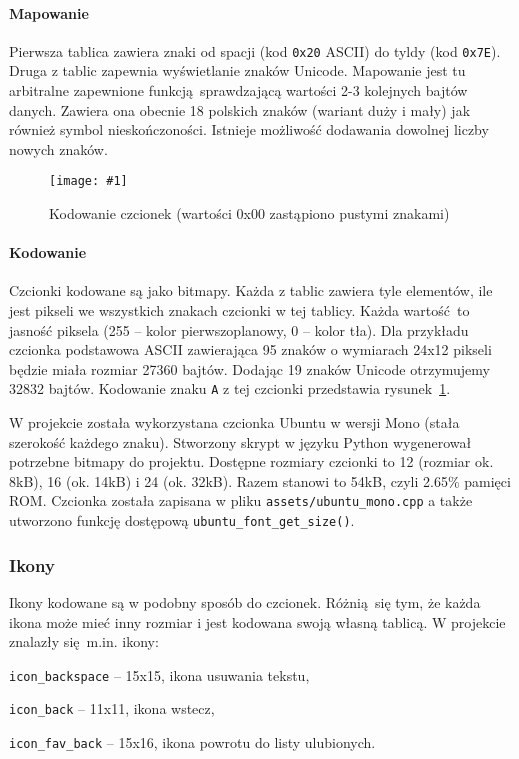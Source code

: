 \documentclass[polish]{aghengthesis}
\let\tempone\itemize
\let\temptwo\enditemize
\renewenvironment{itemize}{\tempone\setlength{\itemsep}{0cm}}{\temptwo}
\newcommand{\imgint}[4]{
	\begin{figure}[{#4}]
		\centering
		\texttt{[image: \#1]}
		\caption{#2}
		\label{#1}
	\end{figure}
}
\newcommand{\imgh}[3]{\imgint{#1}{#2}{#3}{H}}
\begin{document}
				\paragraph{Mapowanie}
					Pierwsza tablica zawiera znaki od spacji (kod \lstinline|0x20| ASCII) do tyldy (kod \lstinline|0x7E|). Druga z tablic zapewnia wyświetlanie znaków Unicode. Mapowanie jest tu arbitralne zapewnione funkcją sprawdzającą wartości 2-3 kolejnych bajtów danych. Zawiera ona obecnie 18 polskich znaków (wariant duży i mały) jak również symbol nieskończoności. Istnieje możliwość dodawania dowolnej liczby nowych znaków.
				
				\imgh{3/PicoRadio-screen-font}{Kodowanie czcionek (wartości 0x00 zastąpiono pustymi znakami)}{0.6}
				\paragraph{Kodowanie}
					Czcionki kodowane są jako bitmapy. Każda z tablic zawiera tyle elementów, ile jest pikseli we wszystkich znakach czcionki w tej tablicy. Każda wartość to jasność piksela (255 -- kolor pierwszoplanowy, 0 -- kolor tła). Dla przykładu czcionka podstawowa ASCII zawierająca 95 znaków o wymiarach 24x12 pikseli będzie miała rozmiar 27360 bajtów. Dodając 19 znaków Unicode otrzymujemy 32832 bajtów. Kodowanie znaku \lstinline|A| z tej czcionki przedstawia rysunek~\ref{3/PicoRadio-screen-font}.
				
				$ $\\
				W projekcie została wykorzystana czcionka Ubuntu\textsuperscript{\cite{ubuntu_font}} w wersji Mono (stała szerokość każdego znaku). Stworzony skrypt w języku Python wygenerował potrzebne bitmapy do projektu. Dostępne rozmiary czcionki to 12 (rozmiar ok. 8kB), 16 (ok. 14kB) i 24 (ok. 32kB). Razem stanowi to 54kB, czyli 2.65\% pamięci ROM. Czcionka została zapisana w pliku \lstinline|assets/ubuntu_mono.cpp| a także utworzono funkcję dostępową \lstinline|ubuntu_font_get_size()|. 
				
			\subsubsection{Ikony}
				Ikony kodowane są w podobny sposób do czcionek. Różnią się tym, że każda ikona może mieć inny rozmiar i jest kodowana swoją własną tablicą. W projekcie znalazły się m.in. ikony:
				\begin{itemize}
					\item \lstinline|icon_backspace| -- 15x15, ikona usuwania tekstu,
					\item \lstinline|icon_back| -- 11x11, ikona wstecz,
					\item \lstinline|icon_fav_back| -- 15x16, ikona powrotu do listy ulubionych.
				\end{itemize}
		
\end{document}
